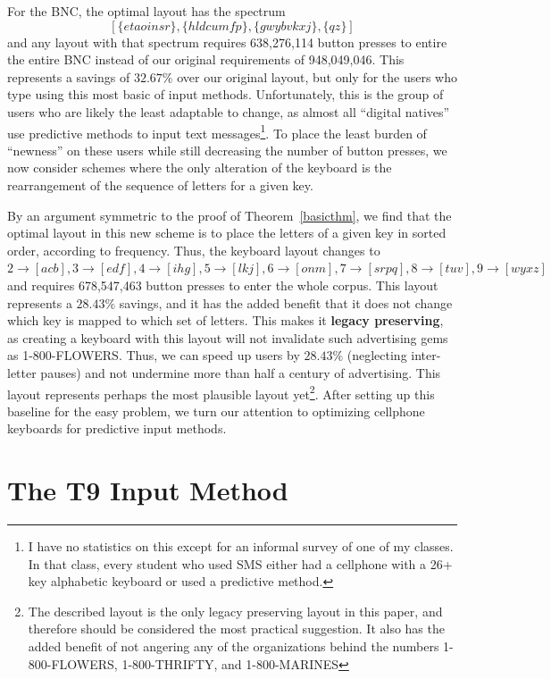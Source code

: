\documentclass[runningheads]{llncs}
\newcommand{\newword}[1]{{\bf #1}}
\begin{document}
For the BNC, the optimal layout has the spectrum $$[\{etaoinsr\}, \{hldcumfp\},
\{gwybvkxj\}, \{qz\}]$$ and any layout with that spectrum requires 638,276,114
button presses to entire the entire BNC instead of our original requirements of
948,049,046.  This represents a savings of $32.67\%$ over our original layout,
but only for the users who type using this most basic of input methods.
Unfortunately, this is the group of users who are likely the least adaptable to
change, as almost all ``digital natives'' use predictive methods to input text
messages\footnote{I have no statistics on this except for an informal survey of
one of my classes.  In that class, every student who used SMS either had a
cellphone with a 26+ key alphabetic keyboard or used a predictive method.}. 
To place the least burden of ``newness'' on these users while still
decreasing the number of button presses, we now consider schemes where the only
alteration of the keyboard is the rearrangement of the sequence of letters for
a given key.

By an argument symmetric to the proof of Theorem~\ref{basicthm}, we find that
the optimal layout in this new scheme is to place the letters of a given key in
sorted order, according to frequency.  Thus, the keyboard layout changes to
$2\to[acb], 3\to[edf], 4\to[ihg], 5\to[lkj], 6\to[onm], 7\to[srpq], 8\to[tuv],
9\to[wyxz]$ and requires 678,547,463 button presses to enter the whole corpus.
This layout represents a $28.43\%$ savings, and it has the added benefit that
it does not change which key is mapped to which set of letters.  This makes it
\newword{legacy preserving}, as creating a keyboard with this layout will not
invalidate such advertising gems as 1-800-FLOWERS.  Thus, we can speed up users
by $28.43\%$ (neglecting inter-letter pauses) and not undermine more than half
a century of advertising.  This layout represents perhaps the most plausible
layout yet\footnote{The described layout is the only legacy preserving layout
in this paper, and therefore should be considered the most practical
suggestion.  It also has the added benefit of not angering any of the
organizations behind the numbers 1-800-FLOWERS, 1-800-THRIFTY, and
1-800-MARINES}.  After setting up this baseline for the easy problem, we turn
our attention to optimizing cellphone keyboards for predictive input methods.

\section{The T9 Input Method}
\end{document}
